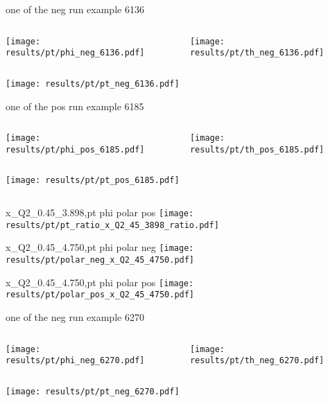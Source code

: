 \begin{frame}{one of the neg run example 6136}
\begin{columns}
\begin{column}[T]{0.5\textwidth}
\texttt{[image: results/pt/phi\_neg\_6136.pdf]}
\end{column}
\begin{column}[T]{0.5\textwidth}
\texttt{[image: results/pt/th\_neg\_6136.pdf]}
\end{column}
\end{columns}
\texttt{[image: results/pt/pt\_neg\_6136.pdf]}
\end{frame}
\begin{frame}{one of the pos run example 6185}
\begin{columns}
\begin{column}[T]{0.5\textwidth}
\texttt{[image: results/pt/phi\_pos\_6185.pdf]}
\end{column}
\begin{column}[T]{0.5\textwidth}
\texttt{[image: results/pt/th\_pos\_6185.pdf]}
\end{column}
\end{columns}
\begin{columns}
\begin{column}[T]{0.5\textwidth}
\texttt{[image: results/pt/pt\_pos\_6185.pdf]}
\end{column}
\begin{column}[T]{0.5\textwidth}
\end{column}
\end{columns}
\end{frame}
\begin{frame}{x\_Q2\_0.45\_3.898,pt phi polar pos}
\texttt{[image: results/pt/pt\_ratio\_x\_Q2\_45\_3898\_ratio.pdf]}
\end{frame}
\begin{frame}{x\_Q2\_0.45\_4.750,pt phi polar neg}
\texttt{[image: results/pt/polar\_neg\_x\_Q2\_45\_4750.pdf]}
\end{frame}
\begin{frame}{x\_Q2\_0.45\_4.750,pt phi polar pos}
\texttt{[image: results/pt/polar\_pos\_x\_Q2\_45\_4750.pdf]}
\end{frame}
\begin{frame}{one of the neg run example 6270}
\begin{columns}
\begin{column}[T]{0.5\textwidth}
\texttt{[image: results/pt/phi\_neg\_6270.pdf]}
\end{column}
\begin{column}[T]{0.5\textwidth}
\texttt{[image: results/pt/th\_neg\_6270.pdf]}
\end{column}
\end{columns}
\texttt{[image: results/pt/pt\_neg\_6270.pdf]}
\end{frame}
